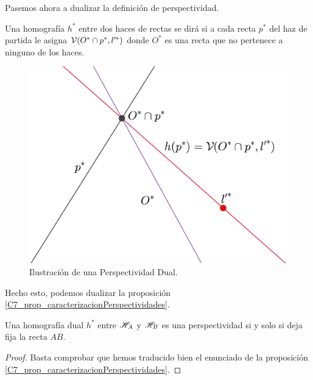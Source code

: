 Pasemos ahora a dualizar la definición de perspectividad.
\begin{defi}
	Una homografía $h^*$ entre dos haces de rectas se dirá  si a cada recta $p^*$ del haz de partida le asigna $\mathcal{V}(O^*\cap p^*,l'^*)$ donde $O^*$ es una recta que no pertenece a ninguno de los haces.
\end{defi}
\begin{figure}[h]
	\centering
	\includegraphics[scale=.1]{Graficos/perspectividadDual.eps}
	\caption{Ilustración de una Perspectividad Dual.}
	\label{C7_img_perspectividadDual}
\end{figure}
Hecho esto, podemos dualizar la proposición \ref{C7_prop_caracterizacionPerspectividades}.
\begin{prop}
	\label{C7_lem_caracterizacion_persp_dual}
	Una homografía dual $h^*$ entre $\mathscr{H}_A$ y $\mathscr{H}_B$ es una perspectividad si y solo si deja fija la recta $AB$.
\end{prop}
\begin{proof}
	Basta comprobar que hemos traducido bien el enunciado de la proposición \ref{C7_prop_caracterizacionPerspectividades}.
\end{proof}
